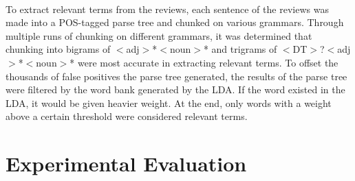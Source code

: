 \documentclass{article}
\begin{document}
\\
To extract relevant terms from the reviews, each sentence of the reviews was made into a POS-tagged parse tree and chunked on various grammars. Through multiple runs of chunking on different grammars, it was determined that chunking into bigrams of $<$adj$>$*$<$noun$>$* and trigrams of $<$DT$>$?$<$adj$>$*$<$noun$>$* were most accurate in extracting relevant terms. To offset the thousands of false positives the parse tree generated, the results of the parse tree were filtered by the word bank generated by the LDA. If the word existed in the LDA, it would be given heavier weight. At the end, only words with a weight above a certain threshold were considered relevant terms. 

\section{Experimental Evaluation} 
\end{document}
